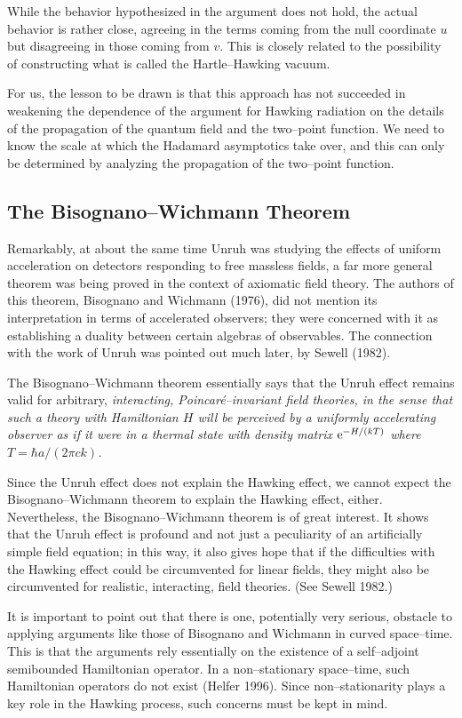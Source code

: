 While the behavior hypothesized in the argument 
does not hold, the actual behavior
is rather close, agreeing in the terms coming from the null coordinate $u$ but
disagreeing in those coming from $v$.  This is closely related to the
possibility of constructing what is called the Hartle--Hawking vacuum.

For us, the lesson to be drawn is that this approach has not succeeded in
weakening the dependence of the argument for Hawking radiation on the details
of the propagation of the quantum field and the two--point function.  We need
to know the scale at which the Hadamard asymptotics take over, and this can
only be determined by analyzing the propagation of the two--point function.
	   
\subsection{The Bisognano--Wichmann Theorem}

Remarkably, at about the same time Unruh was studying the effects of
uniform acceleration on detectors responding to free massless fields,
a far more general theorem was being proved in the context of axiomatic
field theory.  The authors of this theorem, Bisognano and Wichmann (1976),
did not mention its interpretation in terms of accelerated observers;
they were concerned with it as establishing a duality between certain
algebras of observables.  The connection with the work of Unruh was
pointed out much later, by Sewell (1982).  

The Bisognano--Wichmann theorem essentially says that the Unruh effect remains
valid for arbitrary, \it interacting, \rm Poincar\'e--invariant field theories,
in the sense that such a theory with Hamiltonian $H$ will be perceived by a
uniformly accelerating observer as if it were in a thermal state with density
matrix $\e^{-H/(kT)}$ where $T=\hbar a/(2\pi ck)$.

Since the Unruh effect does not explain the Hawking effect, we cannot expect
the Bisognano--Wichmann theorem to explain the Hawking effect, either. 
Nevertheless, the Bisognano--Wichmann theorem is of great interest.  It shows
that the Unruh effect is profound and not just a peculiarity of an artificially
simple field equation; in this way, it also gives hope that if the difficulties
with the Hawking effect could be circumvented for linear fields, they might
also be circumvented for realistic, interacting, field theories.  (See Sewell
1982.)

It is important to point out that there is one, potentially very serious,
obstacle to applying arguments like those of Bisognano and Wichmann in curved
space--time.  This is that the arguments rely essentially on the existence of a
self--adjoint semibounded Hamiltonian operator.  In a non--stationary
space--time, such Hamiltonian operators do not exist (Helfer 1996).  Since
non--stationarity  plays a key role in the Hawking process, such concerns must
be kept in mind.

